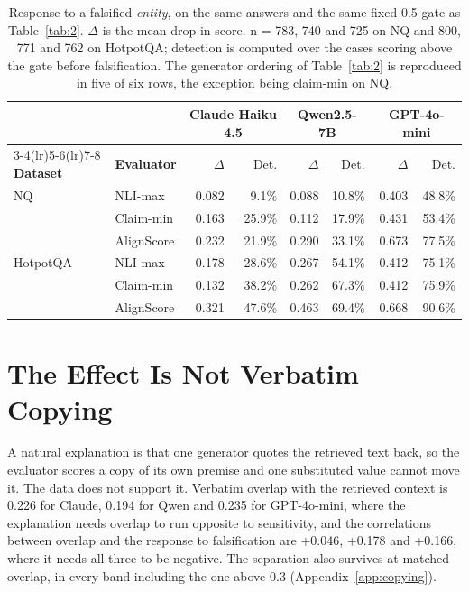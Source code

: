 \documentclass[11pt]{article}
\begin{document}
\begin{table}[t]
\centering
\small
\begin{tabular}{llrrrrrr}
\toprule
 & & \multicolumn{2}{c}{\textbf{Claude Haiku 4.5}} & \multicolumn{2}{c}{\textbf{Qwen2.5-7B}} & \multicolumn{2}{c}{\textbf{GPT-4o-mini}} \\
\cmidrule(lr){3-4}\cmidrule(lr){5-6}\cmidrule(lr){7-8}
\textbf{Dataset} & \textbf{Evaluator} & $\Delta$ & Det. & $\Delta$ & Det. & $\Delta$ & Det. \\
\midrule
NQ & NLI-max & 0.082 & 9.1\% & 0.088 & 10.8\% & 0.403 & 48.8\% \\
 & Claim-min & 0.163 & 25.9\% & 0.112 & 17.9\% & 0.431 & 53.4\% \\
 & AlignScore & 0.232 & 21.9\% & 0.290 & 33.1\% & 0.673 & 77.5\% \\
\midrule
HotpotQA & NLI-max & 0.178 & 28.6\% & 0.267 & 54.1\% & 0.412 & 75.1\% \\
 & Claim-min & 0.132 & 38.2\% & 0.262 & 67.3\% & 0.412 & 75.9\% \\
 & AlignScore & 0.321 & 47.6\% & 0.463 & 69.4\% & 0.668 & 90.6\% \\
\bottomrule
\end{tabular}
\caption{Response to a falsified \emph{entity}, on the same answers and the same fixed 0.5 gate as Table~\ref{tab:2}. $\Delta$ is the mean drop in score. n = 783, 740 and 725 on NQ and 800, 771 and 762 on HotpotQA; detection is computed over the cases scoring above the gate before falsification. The generator ordering of Table~\ref{tab:2} is reproduced in five of six rows, the exception being claim-min on NQ.}
\label{tab:entity}
\end{table}

\section{The Effect Is Not Verbatim Copying}
\label{sec:copying}

A natural explanation is that one generator quotes the retrieved text back, so the evaluator scores a copy of its own premise and one substituted value cannot move it. The data does not support it. Verbatim overlap with the retrieved context is 0.226 for Claude, 0.194 for Qwen and 0.235 for GPT-4o-mini, where the explanation needs overlap to run opposite to sensitivity, and the correlations between overlap and the response to falsification are +0.046, +0.178 and +0.166, where it needs all three to be negative. The separation also survives at matched overlap, in every band including the one above 0.3 (Appendix~\ref{app:copying}).
\end{document}
